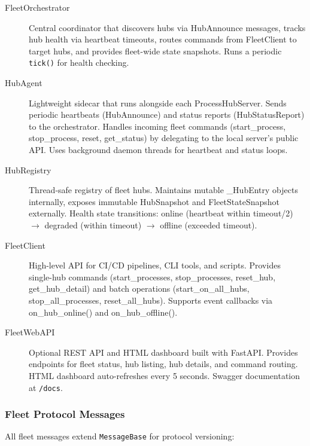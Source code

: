 \begin{description}
   \item[FleetOrchestrator] Central coordinator that discovers hubs via HubAnnounce messages,
        tracks hub health via heartbeat timeouts, routes commands from FleetClient to target hubs,
        and provides fleet-wide state snapshots. Runs a periodic \texttt{tick()} for health checking.

   \item[HubAgent] Lightweight sidecar that runs alongside each ProcessHubServer. Sends periodic
        heartbeats (HubAnnounce) and status reports (HubStatusReport) to the orchestrator. Handles
        incoming fleet commands (start\_process, stop\_process, reset, get\_status) by delegating
        to the local server's public API. Uses background daemon threads for heartbeat and status loops.

   \item[HubRegistry] Thread-safe registry of fleet hubs. Maintains mutable \_HubEntry objects
        internally, exposes immutable HubSnapshot and FleetStateSnapshot externally. Health state
        transitions: online (heartbeat within timeout/2) $\rightarrow$ degraded (within timeout)
        $\rightarrow$ offline (exceeded timeout).

   \item[FleetClient] High-level API for CI/CD pipelines, CLI tools, and scripts. Provides
        single-hub commands (start\_processes, stop\_processes, reset\_hub, get\_hub\_detail) and
        batch operations (start\_on\_all\_hubs, stop\_all\_processes, reset\_all\_hubs). Supports
        event callbacks via on\_hub\_online() and on\_hub\_offline().

   \item[FleetWebAPI] Optional REST API and HTML dashboard built with FastAPI. Provides endpoints
        for fleet status, hub listing, hub details, and command routing. HTML dashboard auto-refreshes
        every 5 seconds. Swagger documentation at \texttt{/docs}.
\end{description}

\subsubsection{Fleet Protocol Messages}

All fleet messages extend \texttt{MessageBase} for protocol versioning:

